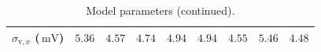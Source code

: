 \documentclass[10pt,a4paper,twoside,american]{article}
\theoremstyle{definitionstyle}
\newcommand{\mV}{\,\text{mV}}
\begin{document}
\begin{table}[H]
\begin{tabular}
{\begin{tabular}{|p{14ex}|>{\raggedleft}p{7ex}|>{\raggedleft}p{7ex}|>{\raggedleft}p{7ex}|>{\raggedleft}p{7ex}|>{\raggedleft}p{7ex}|>{\raggedleft}p{7ex}|>{\raggedleft}p{7ex}|>{\raggedleft\arraybackslash}p{7ex}|}
        \hline
	\vspace{-1ex} $\sigma_{\text{v}, x}$ ($\mV$) & \vspace{-1ex} $5.36$ & \vspace{-1ex} $4.57$ & \vspace{-1ex} $4.74$ & \vspace{-1ex} $4.94$ & \vspace{-1ex} $4.94$ & \vspace{-1ex} $4.55$ & \vspace{-1ex} $5.46$ & \vspace{-1ex} $4.48$\\
        \hline
\end{tabular}
}\\
\\
\hline
\end{tabular}

\caption{Model parameters (continued).}
\end{table}
\clearpage
\appendix
\end{document}
